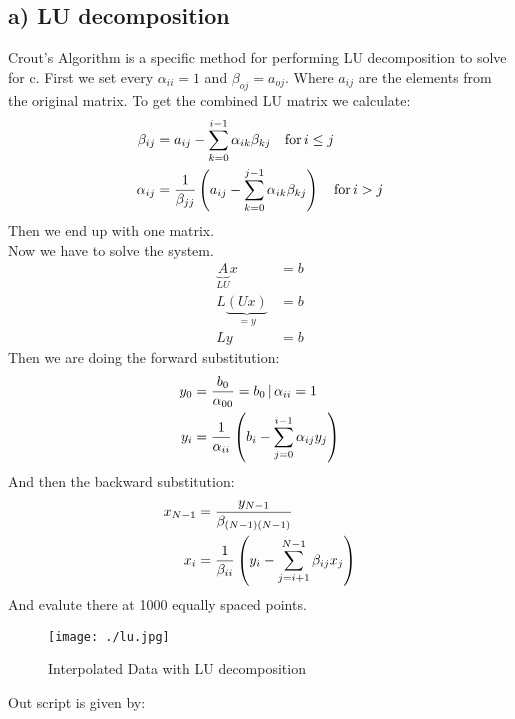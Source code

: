 \subsection*{a) LU decomposition}
Crout's Algorithm is a specific method for performing LU decomposition to solve for c.
First we set every $\alpha_{ii} = 1$  and $\beta_{oj} = a_{oj}$. Where $a_{ij}$ are the elements from the original matrix. To get the combined LU matrix we calculate: 
\begin{align}
    \beta_{ij} &= a_{ij} - \sum_{k=0}^{i-1} \alpha_{ik}\beta_{kj}  \quad \text{for} \, i \leq j \\
    \alpha_{ij} &= \frac{1}{\beta_{jj}} \left({a_{ij}-\sum_{k=0}^{j-1}\alpha_{ik}\beta_{kj} }\right) \quad \text{for}\, i > j
\end{align}
Then we end up with one matrix.\\
Now we have to solve the system. 
\begin{align}
    \underbrace{A}_{LU}x &= b\\
    L\underbrace{(Ux)}_{=y} &= b\\
    Ly &= b
\end{align}
Then we are doing the forward substitution:
\begin{align}
    y_{0} &= \frac{b_0}{\alpha_{00}}= b_0 \,| \, \alpha_{ii} = 1\\
    y_i &= \frac{1}{\alpha_{ii}} \left({b_i - \sum_{j=0}^{i-1}\alpha_{ij}y_j}\right)
\end{align}
And then the backward substitution: 
\begin{align}
    x_{N-1} &= \frac{y_{N-1}}{\beta_{(N-1)(N-1)}}\\
    x_i &= \frac{1}{\beta_{ii}} \left({y_i - \sum_{j = i+1}^{N-1}\beta_{ij}x_j}\right)
\end{align}
And evalute there at 1000 equally spaced points.

\begin{figure}
    \centering
    \texttt{[image: ./lu.jpg]}
    \caption{Interpolated Data with LU decomposition}
    \label{fig:enter-label}
\end{figure}


Out script is given by:

